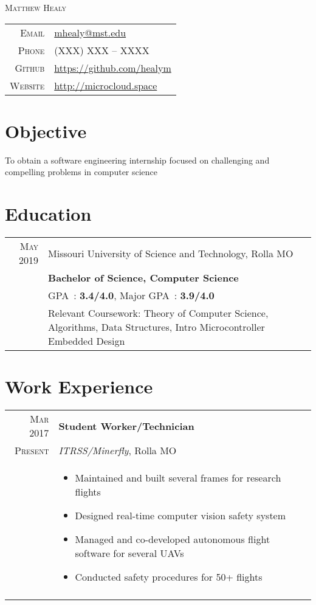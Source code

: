 \documentclass[a4paper,10pt]{article}
\newcommand{\br}{\\\multicolumn{2}{c}{}}
\begin{document}
\pagestyle{empty}

\par{\centering
    {\Huge \textsc{Matthew Healy}
}\bigskip\par}

\begin{center}
\begin{tabular}{rl}
    \textsc{Email } & \href{mailto:mhealy@mst.edu}{mhealy@mst.edu} \\
    \textsc{Phone }        & (XXX) XXX -- XXXX  \\
    \textsc{Github }       & \url{https://github.com/healym} \\
    \textsc{Website }      & \url{http://microcloud.space}
\end{tabular}
\end{center}

\section{Objective}
To obtain a software engineering internship focused on challenging and compelling problems in computer science


\section{Education}
\begin{tabular}{r|p{15cm}}
    \textsc{May} 2019 & Missouri University of Science and Technology, Rolla MO  \\
                      & \textbf{Bachelor of Science, Computer Science} \\
                      & GPA~: \textbf{3.4/4.0}, Major GPA~: \textbf{3.9/4.0} \\
                      & Relevant Coursework:
                      Theory of Computer Science,
                      Algorithms,
                      Data Structures,
                      Intro Microcontroller Embedded Design
\end{tabular}


\section{Work Experience}
\begin{tabular}{r|p{15cm}}
    \textsc{Mar 2017} & \textbf{Student Worker/Technician} \\
    \textsc{Present}         & \textit{ITRSS/Minerfly}, Rolla MO \\ &
    \begin{itemize}
    \item{Maintained and built several frames for research flights}
    \item{Designed real-time computer vision safety system}
    \item{Managed and co-developed autonomous flight software for several UAVs}
    \item{Conducted safety procedures for 50+ flights}

    \end{itemize} \br\\

\end{tabular}
\end{document}
